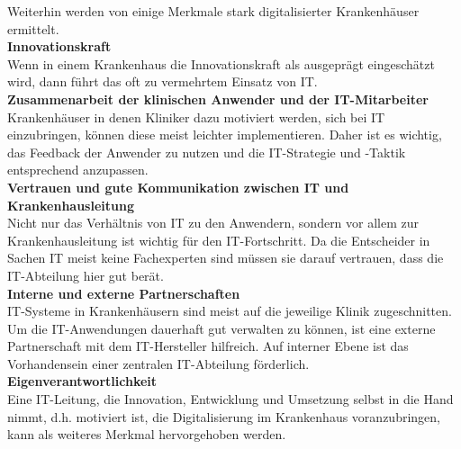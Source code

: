 Weiterhin werden von \cite{huebner2019} einige Merkmale stark digitalisierter Krankenhäuser ermittelt.
\vspace{\parheadvspace}\\
\textbf{Innovationskraft}\\
Wenn in einem Krankenhaus die Innovationskraft als ausgeprägt eingeschätzt wird, dann führt das oft zu vermehrtem Einsatz von IT. 
\vspace{\parheadvspace}\\
\textbf{Zusammenarbeit der klinischen Anwender und der IT-Mitarbeiter}\\
Krankenhäuser in denen Kliniker dazu motiviert werden, sich bei IT einzubringen, können diese meist leichter implementieren. Daher ist es wichtig, das Feedback der Anwender zu nutzen und die IT-Strategie und -Taktik entsprechend anzupassen.
\vspace{\parheadvspace}\\
\textbf{Vertrauen und gute Kommunikation zwischen IT und Krankenhausleitung}\\
Nicht nur das Verhältnis von IT zu den Anwendern, sondern vor allem zur Krankenhausleitung ist wichtig für den IT-Fortschritt. Da die Entscheider in Sachen IT meist keine Fachexperten sind müssen sie darauf vertrauen, dass die IT-Abteilung hier gut berät.
\vspace{\parheadvspace}\\
\textbf{Interne und externe Partnerschaften}\\
IT-Systeme in Krankenhäusern sind meist auf die jeweilige Klinik zugeschnitten. Um die IT-Anwendungen dauerhaft gut verwalten zu können, ist eine externe Partnerschaft mit dem IT-Hersteller hilfreich. Auf interner Ebene ist das Vorhandensein einer zentralen IT-Abteilung förderlich.
\vspace{\parheadvspace}\\
\textbf{Eigenverantwortlichkeit}\\
Eine IT-Leitung, die Innovation, Entwicklung und Umsetzung selbst in die Hand nimmt, d.h. motiviert ist, die Digitalisierung im Krankenhaus voranzubringen, kann als weiteres Merkmal hervorgehoben werden.
